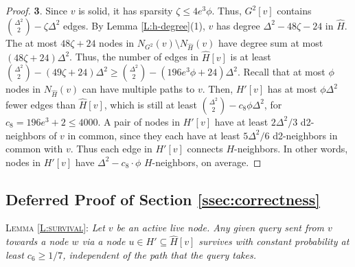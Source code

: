 \begin{proof}
\textbf{3}. 
Since $v$ is solid, it has sparsity $\zeta \le 4e^3 \phi$. Thus, $G^2[v]$ contains $\binom{\Delta^2}{2} - \zeta \Delta^2$ edges. 
By Lemma \ref{L:h-degree}(1), $v$ has degree $\Delta^2 - 48\zeta - 24$ in $\hat{H}$. The at most 
$48\zeta+24$ nodes in $N_{G^2}(v) \setminus N_{\hat{H}}(v)$ have degree sum at most $(48\zeta+24) \Delta^2$. Thus, the number of edges in $\hat{H}[v]$ is at least  
$\binom{\Delta^2}{2} - (49\zeta +24)\Delta^2 \ge \binom{\Delta^2}{2} - (196e^3\phi+24)\Delta^2$.
Recall that at most $\phi$ nodes in $N_{\hat{H}}(v)$ can have multiple paths to $v$. 
Then, $H'[v]$ has at most $\phi \Delta^2$ fewer edges than $\hat{H}[v]$, which is still at least $\binom{\Delta^2}{2} - c_8\phi\Delta^2$, for $c_8 = 196e^3+2 \le 4000$. A pair of nodes in $H'[v]$ have at least $2\Delta^2/3$ d2-neighbors of $v$ in common, since they each have at least $5\Delta^2/6$ d2-neighbors in common with $v$. Thus each edge in $H'[v]$ connects $H$-neighbors. In other words, nodes in $H'[v]$ have $\Delta^2 - c_8 \cdot \phi$ $H$-neighbors, on average.
\end{proof}

\subsection{Deferred Proof of Section \ref{ssec:correctness}}
\label{app:correctness}

 \textsc{Lemma \ref{L:survival}}: \emph{Let $v$ be an active live node. 
Any given query sent from $v$ towards a node $w$ via a node $u\in H'\subseteq \hat{H}[v]$ survives with constant probability at least $c_6 \ge 1/7$, independent of the path that the query takes.}

